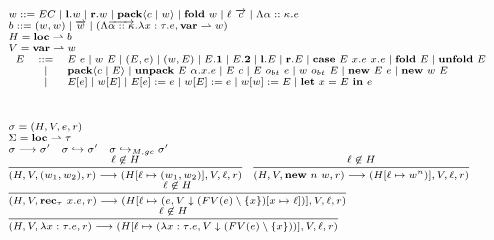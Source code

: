 \documentclass[fleqn]{article}
\begin{document}
\[
\scriptsize
\begin{array}{l}
	w ::= EC \mid \mathbf{l}.w \mid \mathbf{r}.w \mid \mathbf{pack} \langle c \mid w \rangle \mid \mathbf{fold}~w \mid \ell~\overrightarrow{c} \mid \Lambda \alpha :: \kappa. e \\
	b ::= (w,w) \mid \overrightarrow{w} \mid (\Lambda \overrightarrow{\alpha::\kappa}. \lambda x:\tau. e, \mathbf{var} \rightharpoonup w) \\
	H = \mathbf{loc} \rightharpoonup b \\
	V = \mathbf{var} \rightharpoonup w \\
	\begin{array}{lcl}
	E & ::=&  E~e \mid w~E \mid (E,e) \mid (w,E) \mid E.\mathbf{1} \mid E.\mathbf{2} \mid \mathbf{l}.E \mid \mathbf{r}.E \mid \mathbf{case}~E~x.e~x.e \mid \mathbf{fold}~E \mid \mathbf{unfold}~E \\
	& \mid & \mathbf{pack}\langle c \mid E \rangle \mid \mathbf{unpack}~E~\alpha.x.e \mid E~c \mid E~o_{bt}~e \mid w~o_{bt}~E \mid \mathbf{new}~E~e \mid \mathbf{new}~w~E \\
	& \mid & E[e] \mid w[E] \mid E[e] := e \mid w[E] := e \mid w[w] := E \mid \mathbf{let}~x=E~\mathbf{in}~e
	\end{array} \\
	\\
	\\
	\\
	\sigma = (H, V, e, r) \\
	\Sigma = \mathbf{loc} \rightharpoonup \tau \\
	\sigma \longrightarrow \sigma' \hspace{1em} \sigma \hookrightarrow \sigma' \hspace{1em} \sigma \hookrightarrow_{M,gc} \sigma' \\
	\infer{(H,V,(w_1,w_2),r) \longrightarrow (H[\ell \mapsto (w_1,w_2)],V,\ell,r)}{\ell \not\in H} \hspace{1em}
	\infer{(H,V,\mathbf{new}~n~w,r) \longrightarrow (H[\ell \mapsto w^n)],V,\ell,r)}{\ell \not\in H} \\
	\infer{(H,V,\mathbf{rec}_\tau~x.e,r) \longrightarrow (H[\ell \mapsto (e,V \downarrow (FV(e) \setminus \{x\})[x \mapsto \ell])], V, \ell ,r)}{\ell \not\in H} \\
	\infer{(H,V,\lambda x:\tau. e,r) \longrightarrow (H[\ell \mapsto (\lambda x : \tau. e, V \downarrow (FV(e) \setminus \{x\}))],V,\ell,r)}{\ell \not\in H} \\
	\\
	\\

\end{array}\]
\end{document}
